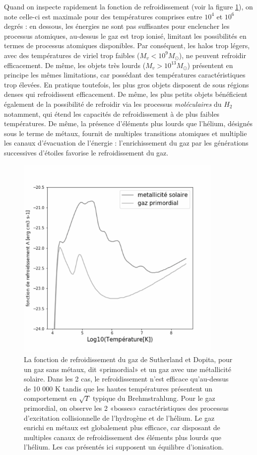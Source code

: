 Quand on inspecte rapidement la fonction de refroidissement (voir la figure \ref{f:coolins}), on note celle-ci est maximale pour des températures comprises entre $10^4$ et $10^6$ degrés : en dessous, les énergies ne sont pas suffisantes pour enclencher les processus atomiques, au-dessus le gaz est trop ionisé, limitant les possibilités en termes de processus atomiques disponibles. Par conséquent, les halos trop légers, avec des températures de viriel trop faibles ($M_v<10^9 M_\odot$), ne peuvent refroidir efficacement. De même, les objets très lourds ($M_v>10^{13} M_\odot$) présentent en principe les mêmes limitations, car possédant des températures caractéristiques trop élevées. En pratique toutefois, les plus gros objets disposent de sous régions denses qui refroidissent efficacement. De même, les plus petits objets bénéficient également de la possibilité de refroidir via les processus \textit{moléculaires} du $H_2$ notamment, qui étend les capacités de refroidissement à de plus faibles températures. De même, la présence d'éléments plus lourds que l'hélium, désignés sous le terme de métaux, fournit de multiples transitions atomiques et multiplie les canaux d'évacuation de l'énergie : l'enrichissement du gaz par les générations successives d'étoiles favorise le refroidissement du gaz.

\begin{figure}[htbp]
	\centering
		\includegraphics[height=10cm]{figs/cool.png}
		\caption[La fonction de refroidissement du gaz]{La fonction de refroidissement du gaz de Sutherland et Dopita, pour un gaz sans métaux, dit «primordial» et un gaz avec une métallicité solaire. Dans les 2 cas, le refroidissement n'est efficace qu'au-dessus de 10 000 K tandis que les hautes températures présentent un comportement en $\sqrt{T}$ typique du Brehmstrahlung. Pour le gaz primordial, on observe les 2 «bosses» caractéristiques des processus d'excitation collisionnelle de l'hydrogène et de l'hélium. Le gaz enrichi en métaux est globalement plus efficace, car disposant de multiples canaux de refroidissement des éléments plus lourds que l'hélium. Les cas présentés ici supposent un équilibre d'ionisation.}
	\label{f:coolins}
\end{figure}



